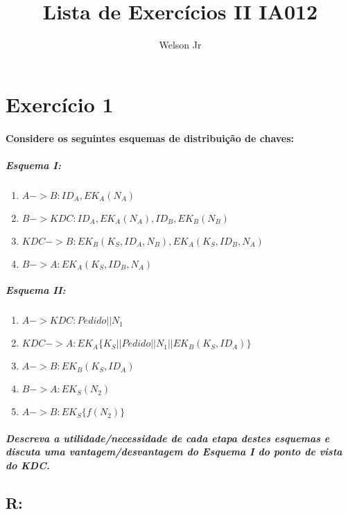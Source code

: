 \documentclass[10pt,a4paper]{report}
\author{Welson Jr}
\title{Lista de Exercícios II IA012}
\begin{document}
\maketitle
\section*{Exercício 1} 
\paragraph{ Considere os seguintes esquemas de distribuição de chaves:}
\subparagraph{ Esquema I:}
\begin{enumerate}[(1)]
\item $A -> B: ID_A, EK_A(N_A)$
\item $B -> KDC: ID_A, EK_A(N_A), ID_B, EK_B(N_B)$
\item $KDC -> B: EK_B(K_S, ID_A, N_B), EK_A(K_S, ID_B, N_A)$
\item $B -> A: EK_A(K_S, ID_B, N_A)$
\end{enumerate}
\subparagraph{ Esquema II:}
\begin{enumerate}[(1)]
\item $A -> KDC: Pedido || N_1$
\item $KDC -> A: EK_A\{K_S || Pedido || N_1 || EK_B(K_S, ID_A)\}$
\item $A -> B: EK_B(K_S, ID_A)$
\item $B -> A: EK_S(N_2)$
\item $A -> B: EK_S\{ f(N_2) \}$
\end{enumerate}
\subparagraph{
Descreva a utilidade/necessidade de cada etapa destes esquemas e discuta uma vantagem/desvantagem do Esquema I do ponto de vista do KDC.}
\subsection*{R:}
\end{document}
